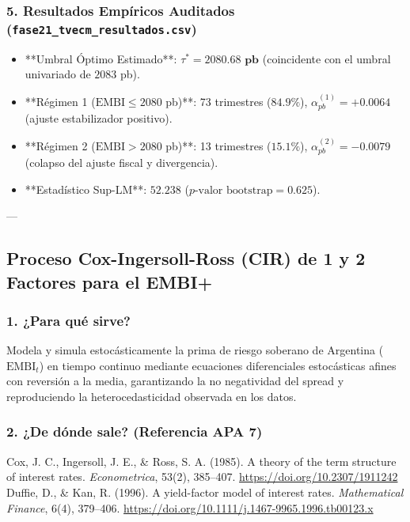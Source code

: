 \documentclass[11pt,a4paper]{article}
\begin{document}
\subsubsection{5. Resultados Empíricos Auditados (\texttt{fase21\_tvecm\_resultados.csv})}
\begin{itemize}
    \item **Umbral Óptimo Estimado**: $\tau^* = \mathbf{2080.68\text{ pb}}$ (coincidente con el umbral univariado de $2083$ pb).
    \item **Régimen 1 ($\text{EMBI} \le 2080$ pb)**: 73 trimestres ($84.9\%$), $\alpha_{pb}^{(1)} = \mathbf{+0.0064}$ (ajuste estabilizador positivo).
    \item **Régimen 2 ($\text{EMBI} > 2080$ pb)**: 13 trimestres ($15.1\%$), $\alpha_{pb}^{(2)} = \mathbf{-0.0079}$ (colapso del ajuste fiscal y divergencia).
    \item **Estadístico Sup-LM**: $52.238$ ($p\text{-valor bootstrap} = 0.625$).
\end{itemize}

---

\subsection{Proceso Cox-Ingersoll-Ross (CIR) de 1 y 2 Factores para el EMBI+}

\subsubsection{1. ¿Para qué sirve?}
Modela y simula estocásticamente la prima de riesgo soberano de Argentina ($\text{EMBI}_t$) en tiempo continuo mediante ecuaciones diferenciales estocásticas afines con reversión a la media, garantizando la no negatividad del spread y reproduciendo la heterocedasticidad observada en los datos.

\subsubsection{2. ¿De dónde sale? (Referencia APA 7)}
\begin{mdframed}[style=apabox]
Cox, J. C., Ingersoll, J. E., \& Ross, S. A. (1985). A theory of the term structure of interest rates. \textit{Econometrica}, 53(2), 385--407. \url{https://doi.org/10.2307/1911242}\\
Duffie, D., \& Kan, R. (1996). A yield-factor model of interest rates. \textit{Mathematical Finance}, 6(4), 379--406. \url{https://doi.org/10.1111/j.1467-9965.1996.tb00123.x}
\end{mdframed}
\end{document}
